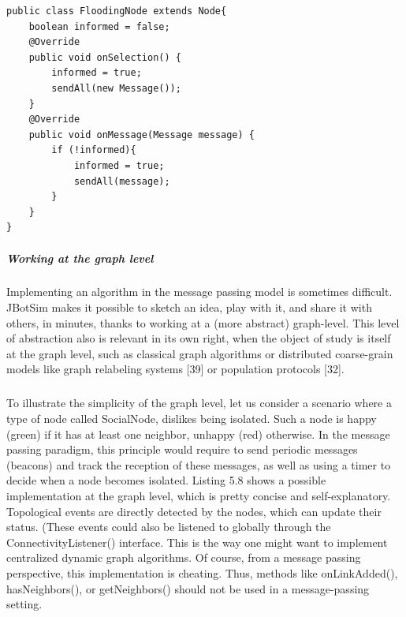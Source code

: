 \begin{lstlisting}[caption=Example of message passing algorithm, captionpos=b]
public class FloodingNode extends Node{
	boolean informed = false;
	@Override 
	public void onSelection() {
		informed = true;
		sendAll(new Message());
	}
	@Override
	public void onMessage(Message message) {
		if (!informed){
			informed = true;
			sendAll(message);
		}
	}
}
\end{lstlisting}
\subparagraph{Working at the graph level}Implementing an algorithm in the message passing model is sometimes difficult. JBotSim makes it possible to sketch an idea, play with it, and share it with others, in minutes, thanks to working at a (more abstract) graph-level. This level of abstraction also is relevant in its own right, when the object of study is itself at the graph level, such as classical graph algorithms or distributed coarse-grain models like graph relabeling systems [39] or population protocols [32].
\subparagraph{}To illustrate the simplicity of the graph level, let us consider a scenario where a type of node called SocialNode, dislikes being isolated. Such a node is happy (green) if it has at least one neighbor, unhappy (red) otherwise. In the message passing paradigm, this principle would require to send periodic messages (beacons) and track the reception of these messages, as well as using a timer to decide when a node becomes isolated. Listing 5.8 shows a possible implementation at the graph level, which is pretty concise and self-explanatory. Topological events are directly detected by the nodes, which can update their status. (These events could also be listened to globally through the ConnectivityListener() interface. This is the way one might want to implement centralized dynamic graph algorithms. Of course, from a message passing perspective, this implementation is cheating. Thus, methods like onLinkAdded(), hasNeighbors(), or getNeighbors() should not be used in a message-passing setting.

